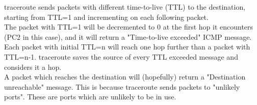 traceroute sends packets with different time-to-live (TTL) to the destination, starting from TTL=1 and incrementing on each following packet. \\
The packet with TTL=1 will be decremented to 0 at the first hop it encounters (PC2 in this case), and it will return a "Time-to-live exceeded" ICMP message. \\
Each packet with initial TTL=n will reach one hop further than a packet with TTL=n-1. traceroute saves the source of every TTL exceeded message and considers it a hop.\\
A packet which reaches the destination will (hopefully) return a "Destination unreachable" message. This is because traceroute sends packets to "unlikely ports". These are ports which are unlikely to be in use.
